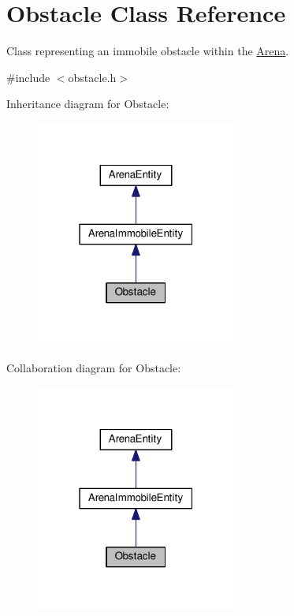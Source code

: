 \hypertarget{classObstacle}{}\section{Obstacle Class Reference}
\label{classObstacle}


Class representing an immobile obstacle within the \hyperlink{classArena}{Arena}.  




{\ttfamily \#include $<$obstacle.\+h$>$}



Inheritance diagram for Obstacle\+:
\nopagebreak
\begin{figure}[H]
\begin{center}
\leavevmode
\includegraphics[width=187pt]{classObstacle__inherit__graph}
\end{center}
\end{figure}


Collaboration diagram for Obstacle\+:
\nopagebreak
\begin{figure}[H]
\begin{center}
\leavevmode
\includegraphics[width=187pt]{classObstacle__coll__graph}
\end{center}
\end{figure}

